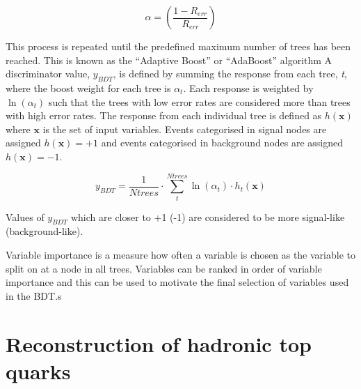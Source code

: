 \begin{equation}
\alpha = \left( \frac{1-R_{err}}{R_{err}}  \right)
\label{eqn:ErrorWeight}
\end{equation}

This process is repeated until the predefined maximum number of trees has been reached. This is known as the ``Adaptive Boost'' or ``AdaBoost'' algorithm
A discriminator value, $y_{BDT}$, is defined by summing the response from each tree, \emph{t}, where the boost weight for each tree is $\alpha_{t}$. Each response is weighted by $\ln \left(\alpha_{t}\right)$ such that the trees with low error rates are considered more than trees with high error rates. The response from each individual tree is defined as $h\left(\textbf{x}\right)$ where $\textbf{x}$ is the set of input variables. Events categorised in signal nodes are assigned $h\left(\textbf{x}\right) = +1 $ and events categorised in background nodes are assigned $h\left(\textbf{x}\right) = -1 $. 

\begin{equation}
y_{BDT} = \frac{1}{Ntrees} \cdot \sum_{t}^{Ntrees} \ln \left(\alpha_{t}\right) \cdot h_{t}\left(\textbf{x}\right)
\end{equation}

Values of $y_{BDT}$ which are closer to +1 (-1) are considered to be more signal-like (background-like).

Variable importance is a measure how often a variable is chosen as the variable to split on at a node in all trees. Variables can be ranked in order of variable importance and this can be used to motivate the final selection of variables used in the BDT.s 

\section{Reconstruction of hadronic top quarks \label{sec:topreco}}

